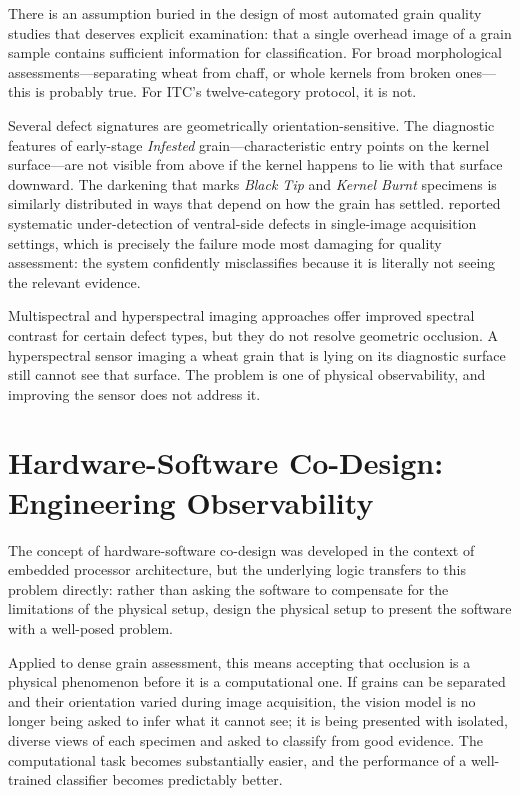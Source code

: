 There is an assumption buried in the design of most automated grain quality studies that deserves explicit examination: that a single overhead image of a grain sample contains sufficient information for classification. For broad morphological assessments---separating wheat from chaff, or whole kernels from broken ones---this is probably true. For ITC's twelve-category protocol, it is not.

Several defect signatures are geometrically orientation-sensitive. The diagnostic features of early-stage \textit{Infested} grain---characteristic entry points on the kernel surface---are not visible from above if the kernel happens to lie with that surface downward. The darkening that marks \textit{Black Tip} and \textit{Kernel Burnt} specimens is similarly distributed in ways that depend on how the grain has settled. \cite{ShenUnsound2023} reported systematic under-detection of ventral-side defects in single-image acquisition settings, which is precisely the failure mode most damaging for quality assessment: the system confidently misclassifies because it is literally not seeing the relevant evidence.

Multispectral and hyperspectral imaging approaches \cite{LiWheat2024, ElMasry2019} offer improved spectral contrast for certain defect types, but they do not resolve geometric occlusion. A hyperspectral sensor imaging a wheat grain that is lying on its diagnostic surface still cannot see that surface. The problem is one of physical observability, and improving the sensor does not address it.

\section{Hardware-Software Co-Design: Engineering Observability}

The concept of hardware-software co-design \cite{Keutzer2000} was developed in the context of embedded processor architecture, but the underlying logic transfers to this problem directly: rather than asking the software to compensate for the limitations of the physical setup, design the physical setup to present the software with a well-posed problem.

Applied to dense grain assessment, this means accepting that occlusion is a physical phenomenon before it is a computational one. If grains can be separated and their orientation varied during image acquisition, the vision model is no longer being asked to infer what it cannot see; it is being presented with isolated, diverse views of each specimen and asked to classify from good evidence. The computational task becomes substantially easier, and the performance of a well-trained classifier becomes predictably better.

